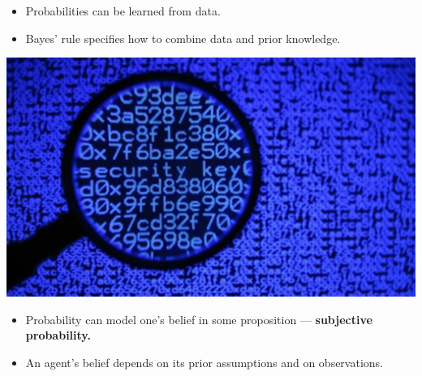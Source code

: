 \documentclass[12pt]{beamer} %
\begin{document}
\begin{slide}
\begin{itemize}
  \item Probabilities can be learned from data.
  \item Bayes' rule specifies how to combine data and prior knowledge.
\end{itemize}

\begin{center}
\includegraphics[width=0.6\columnwidth]{figures/uncert_fig_cyber-security720.pdf}
\end{center}
\end{slide}


\begin{slide}
\begin{itemize}
\item Probability can model one's belief in some
proposition --- \textbf{subjective probability.}
\item An agent's belief depends on its prior assumptions and on observations.
\end{itemize}
\end{slide}
\end{document}
